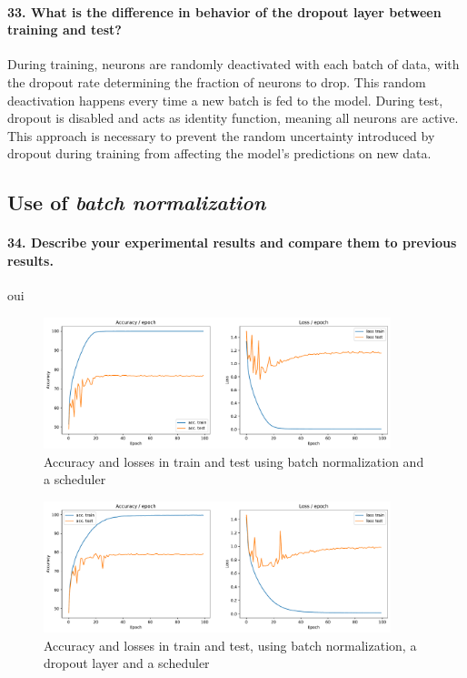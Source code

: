 \paragraph{33. What is the difference in behavior of the dropout layer between training and test?}
During training, neurons are randomly deactivated with each batch of data, with the dropout rate determining the fraction of neurons to drop. This random deactivation happens every time a new batch is fed to the model. During test, dropout is disabled and acts as identity function, meaning all neurons are active. This approach is necessary to prevent the random uncertainty introduced by dropout during training from affecting the model's predictions on new data.

\subsection{Use of \textit{batch normalization}}

\paragraph{34. Describe your experimental results and compare them to previous results.}

oui

\begin{figure}[H]
    \centering
    \includegraphics*[width=0.9\textwidth]{figs/CNN/batchnorm.pdf}
    \caption{Accuracy and losses in train and test using batch normalization and a scheduler}
    \label{fig:batchnorm}
\end{figure}

\begin{figure}[H]
    \centering
    \includegraphics*[width=0.9\textwidth]{figs/CNN/batchnorm_with_dropout.pdf}
    \caption{Accuracy and losses in train and test, using batch normalization, a dropout layer and a scheduler}
    \label{fig:batchnorm_with_dropout}
\end{figure}

